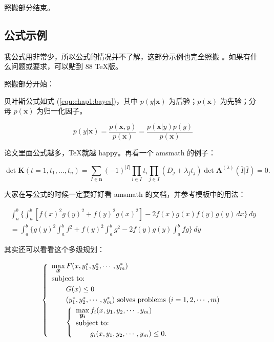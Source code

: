 {\youti 照搬部分结束。}

\subsection{公式示例}

我公式用非常少，所以公式的情况并不了解，这部分示例也完全照搬 \thuthesis。如果有什么问题或要求，可以贴到 88 \TeX 版。

{\youti 照搬部分开始：}

贝叶斯公式如式 (\ref{equ:chap1:bayes})，其中 $p(y|\mathbf{x})$ 为后验；$p(\mathbf{x})$ 为先验；分母 $p(\mathbf{x})$ 为归一化因子。

\begin{equation}
\label{equ:chap1:bayes}
p(y|\mathbf{x}) = \frac{p(\mathbf{x},y)}{p(\mathbf{x})}=
\frac{p(\mathbf{x}|y)p(y)}{p(\mathbf{x})} 
\end{equation}

论文里面公式越多，\TeX 就越 happy。再看一个 \textsf{amsmath} 的例子：

\newcommand{\envert}[1]{\left\lvert#1\right\rvert} 

\begin{equation}\label{detK2}
\det\mathbf{K}(t=1,t_1,\dots,t_n)=\sum_{I\in\mathbf{n}}(-1)^{\envert{I}}
\prod_{i\in I}t_i\prod_{j\in I}(D_j+\lambda_jt_j)\det\mathbf{A}
^{(\lambda)}(\overline{I}|\overline{I})=0.
\end{equation} 

大家在写公式的时候一定要好好看 \textsf{amsmath} 的文档，并参考模板中的用法：

\begin{multline*}\tag{[b]} %
\int_a^b\biggl\{\int_a^b[f(x)^2g(y)^2+f(y)^2g(x)^2]
 -2f(x)g(x)f(y)g(y)\,dx\biggr\}\,dy \\
 =\int_a^b\biggl\{g(y)^2\int_a^bf^2+f(y)^2
  \int_a^b g^2-2f(y)g(y)\int_a^b fg\biggr\}\,dy
\end{multline*}

其实还可以看看这个多级规划：

\begin{equation}\label{bilevel}
\left\{\begin{array}{l}
\max\limits_{{\mbox{\footnotesize\boldmath $x$}}} F(x,y_1^*,y_2^*,\cdots,y_m^*)\\[0.2cm]
\mbox{subject to:}\\[0.1cm]
\qquad G(x)\le 0\\[0.1cm]
\qquad(y_1^*,y_2^*,\cdots,y_m^*)\mbox{ solves problems }(i=1,2,\cdots,m)\\[0.1cm]
\qquad\left\{\begin{array}{l}
    \max\limits_{{\mbox{\footnotesize\boldmath $y_i$}}}f_i(x,y_1,y_2,\cdots,y_m)\\[0.2cm]
    \mbox{subject to:}\\[0.1cm]
    \qquad g_i(x,y_1,y_2,\cdots,y_m)\le 0.
    \end{array}\right.
\end{array}\right.
\end{equation}


